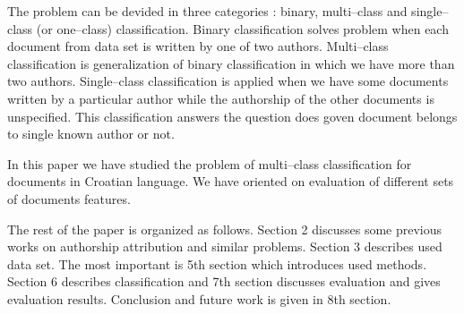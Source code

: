 \documentclass[11pt,english]{article}
\begin{document}
\begin{multicols}{2}
The problem can be devided in three categories \citep{zhao2005effective}: binary,
multi--class and single--class (or one--class) classification. Binary
classification solves problem when each document from data set is written by one
of two authors. Multi--class classification is generalization of binary
classification in which we have more than two authors. Single--class
classification is applied when we have some documents written by a particular
author while the authorship of the other documents is unspecified. This
classification answers the question does goven document belongs to single known
author or not.

In this paper we have studied the problem of multi--class classification for
documents in Croatian language. We have oriented on evaluation of different sets
of documents features.

The rest of the paper is organized as follows. Section 2 discusses some previous
works on authorship attribution and similar problems. Section 3 describes used
data set. The most important is 5th section which introduces used methods.
Section 6 describes classification and 7th section discusses evaluation and
gives evaluation results. Conclusion and future work is given in 8th section.


\end{multicols}
\end{document}

